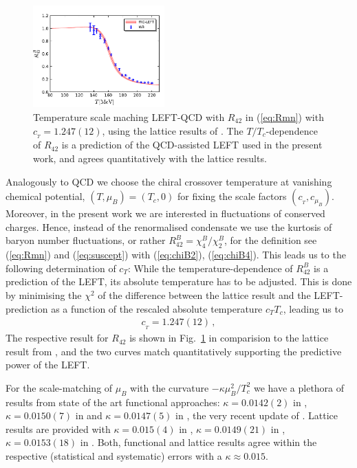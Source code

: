 \documentclass[%
reprint,
superscriptaddress,
showpacs,preprintnumbers,
amsmath,amssymb,
aps,
prd,
]{revtex4-1}
\def\Fig#1{Fig.~\ref{#1}} \def\Tab#1{Tab.~\ref{#1}}
\def\eq#1{(\ref{#1})}
\begin{document}
	
%
\begin{figure}[t]
\includegraphics[width=0.45\textwidth]{T-adjust}
\caption{Temperature scale maching LEFT-QCD with $R_{42}$ in \eq{eq:Rmn} with $c_{_{T}}=1.247(12)$, using the lattice results of \cite{Borsanyi:2018grb}. The $T/T_c$-dependence of $R_{42}$ is a prediction of the QCD-assisted LEFT used in the present work, and agrees quantitatively with the lattice results.}\label{fig:T-adjust}
\end{figure}
%
Analogously to QCD we choose the chiral crossover temperature at vanishing chemical potential, $(T,\mu_B)=(T_c,0)$ for fixing the scale factors $(c_{_T}, c_{\mu_B})$. Moreover, in the present work we are interested in fluctuations of conserved charges. Hence, instead of the renormalised condensate we use the kurtosis of baryon number fluctuations, or rather $R_{42}^B=\chi_4^B/\chi_2^B$, for the definition see \eq{eq:Rmn} and \eq{eq:suscept} with \eq{eq:chiB2}, \eq{eq:chiB4}. This leads us to the following determination of $c_T$: While the temperature-dependence of $R^{B}_{42}$ is a prediction of the LEFT, its absolute temperature has to be adjusted. This is done by minimising the $\chi^2$ of the difference between the lattice result and the LEFT-prediction as a function of the rescaled absolute temperature $c_T T_c$, leading us to 
%
\begin{align}
c_{_{T}}=1.247(12)\,,\label{eq:c_T-LEFT}
\end{align}
%
The respective result for $R_{42}$ is shown in \Fig{fig:T-adjust} in comparision to the lattice result from \cite{Borsanyi:2018grb}, and the two curves match quantitatively supporting the predictive power of the LEFT. 
	
For the scale-matching of $\mu_B$ with the curvature $-\kappa \mu_B^2/T_c^2$ we have a plethora of results from state of the art functional approaches: $\kappa=0.0142(2)$ in  \cite{Fu:2019hdw}, $\kappa=0.0150(7)$ in \cite{Gao:2020qsj} and $\kappa=0.0147(5)$ in \cite{Gao:2020fbl}, the very recent update of \cite{Gao:2020fbl}. Lattice results are provided with $\kappa=0.015(4)$ in \cite{Bazavov:2018mes}, $\kappa=0.0149(21)$ in \cite{Bellwied:2015rza}, $\kappa=0.0153(18)$ in \cite{Borsanyi:2020fev}. Both, functional and lattice results agree within the respective (statistical and systematic) errors with a $\kappa\approx 0.015$. 
\end{document}
